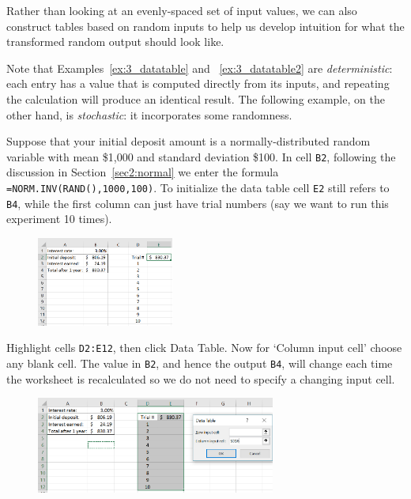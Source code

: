 Rather than looking at an evenly-spaced set of input values, we can also construct tables based on random inputs to help us develop intuition for what the transformed random output should look like.

Note that Examples~\ref{ex:3_datatable} and ~\ref{ex:3_datatable2} are \emph{deterministic}: each entry has a value that is 
computed directly from its inputs, and repeating the calculation will produce an identical result.
The following example, on the other hand, is \emph{stochastic}: it incorporates some randomness.


\begin{myexample}\label{ex:3_datatable3}
Suppose that your initial deposit amount is a normally-distributed random variable with mean \$1,000 and standard deviation \$100.
In cell \texttt{B2}, following the discussion in Section~\ref{sec2:normal} we enter the formula \texttt{=NORM.INV(RAND(),1000,100)}.
To initialize the data table cell \texttt{E2} still refers to \texttt{B4}, while the first column can just have trial numbers (say we want to run this experiment 10 times).

\begin{figure}[htbp]
	\centering
	\includegraphics[width=0.4\textwidth]{fig/3_datatable3_1.png}
	\label{fig:3_datatable3_1}
\end{figure}

Highlight cells \texttt{D2:E12}, then click Data Table.
Now for `Column input cell' choose any blank cell.
The value in \texttt{B2}, and hence the output \texttt{B4}, will change each time the worksheet is recalculated so we do not need to specify a changing input cell.

\begin{figure}[htbp]
	\centering
	\includegraphics[width=0.7\textwidth]{fig/3_datatable3_2.png}
	\label{fig:3_datatable3_2}
\end{figure}


\end{myexample}
